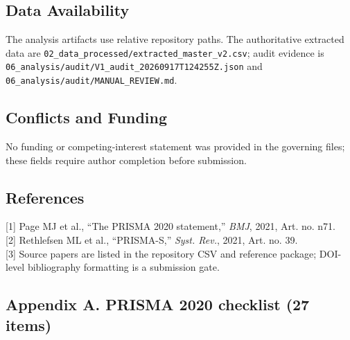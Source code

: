 \documentclass[
  journal,
  10pt]{IEEEtran}
\begin{document}
\subsection{Data Availability}\label{data-availability}

The analysis artifacts use relative repository paths. The authoritative
extracted data are
\texttt{02\_data\_processed/extracted\_master\_v2.csv}; audit evidence
is \texttt{06\_analysis/audit/V1\_audit\_20260917T124255Z.json} and
\texttt{06\_analysis/audit/MANUAL\_REVIEW.md}.

\subsection{Conflicts and Funding}\label{conflicts-and-funding}

No funding or competing-interest statement was provided in the governing
files; these fields require author completion before submission.

\subsection{References}\label{references}

{[}1{]} Page MJ et al., ``The PRISMA 2020 statement,'' \emph{BMJ}, 2021,
Art. no. n71.\\
{[}2{]} Rethlefsen ML et al., ``PRISMA-S,'' \emph{Syst. Rev.}, 2021,
Art. no. 39.\\
{[}3{]} Source papers are listed in the repository CSV and reference
package; DOI-level bibliography formatting is a submission gate.

\subsection{Appendix A. PRISMA 2020 checklist (27
items)}\label{appendix-a-prisma-2020-checklist-27-items}
\end{document}
